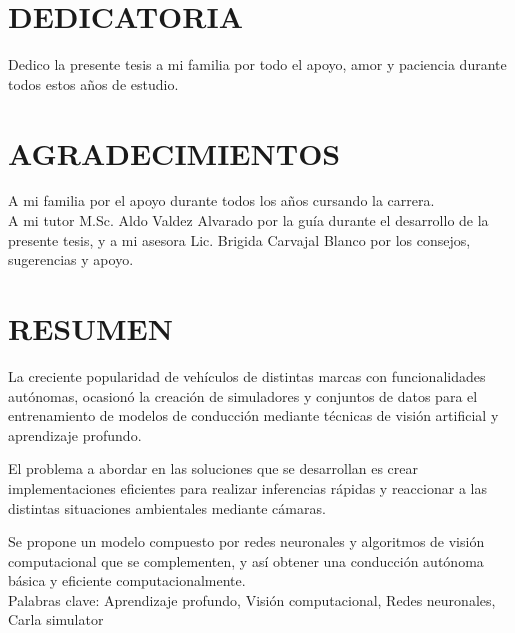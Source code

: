 \section*{DEDICATORIA}
\vfill
\hfill\begin{minipage}{\dimexpr\textwidth-9cm}
Dedico la presente tesis a mi familia por todo el apoyo, amor y paciencia durante todos estos años de estudio.
\end{minipage}

\newpage
\section*{\hspace{5.5cm}AGRADECIMIENTOS}

\begin{center}
	A mi familia por el apoyo durante todos los años cursando la carrera.\\
	\vspace{0.8cm}
	A mi tutor M.Sc. Aldo Valdez Alvarado por la guía durante el desarrollo de la presente tesis, y a mi asesora Lic. Brigida Carvajal Blanco por los consejos, sugerencias y apoyo.
\end{center}

\newpage
\section*{\hspace{6.4cm}RESUMEN}
La creciente popularidad de vehículos de distintas marcas con funcionalidades autónomas, ocasionó la creación de simuladores y conjuntos de datos para el entrenamiento de modelos de conducción mediante técnicas de visión artificial y aprendizaje profundo.

El problema a abordar en las soluciones que se desarrollan es crear implementaciones eficientes para realizar inferencias rápidas y reaccionar a las distintas situaciones ambientales mediante cámaras.

Se propone un modelo compuesto por redes neuronales y algoritmos de visión computacional que se complementen, y así obtener una conducción autónoma básica y eficiente computacionalmente.\\

\noindent Palabras clave: Aprendizaje profundo, Visión computacional, Redes neuronales, Carla simulator

\newpage
